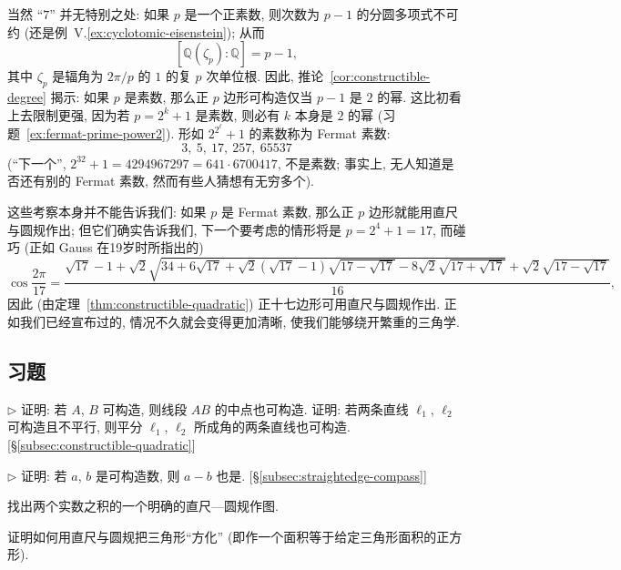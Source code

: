 当然 ``$7$'' 并无特别之处: 如果 $p$ 是一个正素数, 则次数为 $p-1$ 的分圆多项式不可约 (还是例~V.\ref{ex:cyclotomic-eisenstein}); 从而
\[
[\mathbb{Q}(\zeta_p):\mathbb{Q}]=p-1,
\]
其中 $\zeta_p$ 是辐角为 $2\pi/p$ 的 $1$ 的复 $p$ 次单位根. 因此, 推论~\ref{cor:constructible-degree} 揭示: 如果 $p$ 是素数, 那么正 $p$ 边形可构造仅当 $p-1$ 是 $2$ 的幂. 这比初看上去限制更强, 因为若 $p=2^k+1$ 是素数, 则必有 $k$ 本身是 $2$ 的幂 (习题~\ref{ex:fermat-prime-power2}). 形如 $2^{2^{\ell}}+1$ 的素数称为 Fermat 素数:
\[
3,\ 5,\ 17,\ 257,\ 65537
\]
(``下一个'', $2^{32}+1=4294967297=641\cdot 6700417$, 不是素数; 事实上, 无人知道是否还有别的 Fermat 素数, 然而有些人猜想有无穷多个).

这些考察本身并不能告诉我们: 如果 $p$ 是 Fermat 素数, 那么正 $p$ 边形就能用直尺与圆规作出; 但它们确实告诉我们, 下一个要考虑的情形将是 $p=2^4+1=17$, 而碰巧 (正如 Gauss 在19岁时所指出的)
\[
\cos\frac{2\pi}{17}=\frac{\sqrt{17}-1+\sqrt{2}\sqrt{34+6\sqrt{17}+\sqrt{2}(\sqrt{17}-1)\sqrt{17-\sqrt{17}}-8\sqrt{2}\sqrt{17+\sqrt{17}}}+\sqrt{2}\sqrt{17-\sqrt{17}}}{16},
\]
因此 (由定理~\ref{thm:constructible-quadratic}) 正十七边形可用直尺与圆规作出. 正如我们已经宣布过的, 情况不久就会变得更加清晰, 使我们能够绕开繁重的三角学.

\subsection*{习题}
{}

\begin{prob}\label{ex:construct-midpoint}
$\triangleright$ 证明: 若 $A$, $B$ 可构造, 则线段 $AB$ 的中点也可构造. 证明: 若两条直线 $\ell_1$, $\ell_2$ 可构造且不平行, 则平分 $\ell_1$, $\ell_2$ 所成角的两条直线也可构造. [§\ref{subsec:constructible-quadratic}]
\end{prob}

\begin{prob}\label{ex:construct-difference}
$\triangleright$ 证明: 若 $a$, $b$ 是可构造数, 则 $a-b$ 也是. [§\ref{subsec:straightedge-compass}]
\end{prob}

\begin{prob}\label{ex:construct-product}
找出两个实数之积的一个明确的直尺—圆规作图.
\end{prob}

\begin{prob}\label{ex:construct-square-triangle}
证明如何用直尺与圆规把三角形``方化'' (即作一个面积等于给定三角形面积的正方形).
\end{prob}

